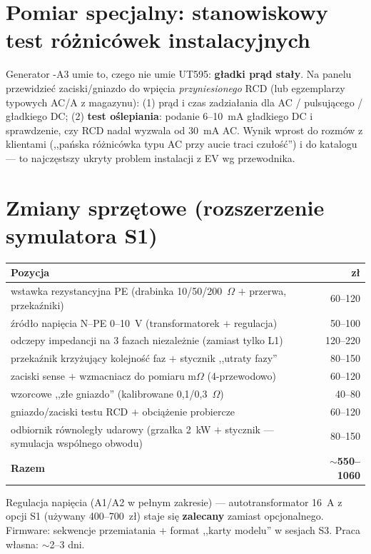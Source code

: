 \documentclass[11pt,a4paper]{article}
\newcommand{\ohm}{$\Omega$}
\begin{document}
\section{Pomiar specjalny: stanowiskowy test różnicówek instalacyjnych}
Generator -A3 umie to, czego nie umie UT595: \textbf{gładki prąd stały}. Na panelu przewidzieć
zaciski/gniazdo do wpięcia \emph{przyniesionego} RCD (lub egzemplarzy typowych AC/A z magazynu):
(1) prąd i czas zadziałania dla AC / pulsującego / gładkiego DC; (2) \textbf{test oślepiania}:
podanie 6--10~mA gładkiego DC i sprawdzenie, czy RCD nadal wyzwala od 30~mA AC. Wynik wprost do
rozmów z klientami (,,pańska różnicówka typu AC przy aucie traci czułość'') i do katalogu ---
to najczęstszy ukryty problem instalacji z EV wg przewodnika.

\section{Zmiany sprzętowe (rozszerzenie symulatora S1)}
\begin{longtable}{@{}p{}r@{}}
\toprule
\textbf{Pozycja} & \textbf{zł}\\
\midrule
wstawka rezystancyjna PE (drabinka 10/50/200~\ohm{} $+$ przerwa, przekaźniki) & 60--120\\
źródło napięcia N--PE 0--10~V (transformatorek $+$ regulacja) & 50--100\\
odczepy impedancji na 3 fazach niezależnie (zamiast tylko L1) & 120--220\\
przekaźnik krzyżujący kolejność faz $+$ stycznik ,,utraty fazy'' & 80--150\\
zaciski sense $+$ wzmacniacz do pomiaru m\ohm{} (4-przewodowo) & 60--120\\
wzorcowe ,,złe gniazdo'' (kalibrowane 0,1/0,3~\ohm) & 40--80\\
gniazdo/zaciski testu RCD $+$ obciążenie probiercze & 60--120\\
odbiornik równoległy udarowy (grzałka 2~kW $+$ stycznik --- symulacja wspólnego obwodu) & 80--150\\
\midrule
\textbf{Razem} & \textbf{$\sim$550--1060}\\
\bottomrule
\end{longtable}
Regulacja napięcia (A1/A2 w pełnym zakresie) --- autotransformator 16~A z opcji S1 (używany
400--700~zł) staje się \textbf{zalecany} zamiast opcjonalnego. Firmware: sekwencje przemiatania
$+$ format ,,karty modelu'' w sesjach S3. Praca własna: $\sim$2--3 dni.
\end{document}
